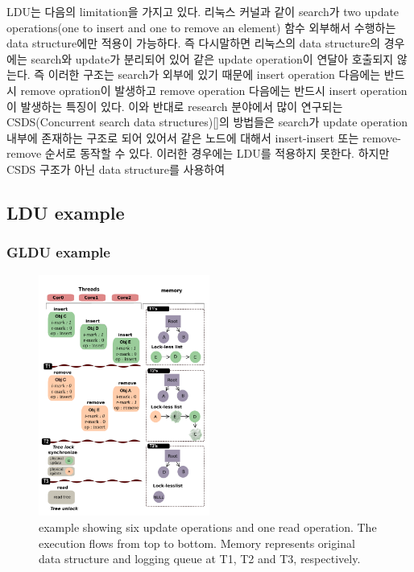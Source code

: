 
\ifkor
LDU는 다음의 limitation을 가지고 있다.
리눅스 커널과 같이 search가 two update operations(one to insert and one to remove
an element) 함수 외부해서 수행하는 data structure에만 적용이 가능하다.
즉 다시말하면 리눅스의 data structure의 경우에는 search와 update가 분리되어 있어 같은 update operation이
연달아 호출되지 않는다.
즉 이러한 구조는 search가 외부에 있기 때문에 insert operation 다음에는 반드시  remove opration이 발생하고 
remove operation 다음에는 반드시 insert operation이 발생하는 특징이 있다.
이와 반대로 research 분야에서 많이 연구되는 CSDS(Concurrent search data structures)[]의 방법들은
search가 update operation 내부에 존재하는 구조로 되어 있어서 같은 노드에 대해서 insert-insert 또는
remove-remove 순서로 동작할 수 있다.
이러한 경우에는 LDU를 적용하지 못한다.
하지만 CSDS 구조가 아닌 data structure를 사용하여 
\else
\fi


\subsection{LDU example}

\subsubsection{GLDU example}
%

\begin{figure}[tb]
  \begin{center}
     \includegraphics[width=0.5\textwidth,height=0.5\textheight,keepaspectratio]{fig/basic}
  \end{center}
  \caption{ example showing six update operations and one read
  operation. The execution flows from top to bottom. Memory represents original
  data structure and logging queue at T1, T2 and T3, respectively.}
  \label{fig:basic}
\end{figure}



